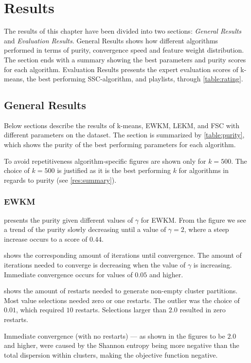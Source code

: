 \documentclass[../report.tex]{subfiles}
\begin{document}
\chapter{Results}
The results of this chapter have been divided into two sections: \textit{General Results} and \textit{Evaluation Results}. General Results shows how different algorithms performed in terms of purity, convergence speed and feature weight distribution. The section ends with a summary showing the best parameters and purity scores for each algorithm. Evaluation Results presents the expert evaluation scores of k-means, the best performing SSC-algorithm, and playlists, through \cref{table:rating}.

\section{General Results}
\label{section:general}
Below sections describe the results of k-means, EWKM, LEKM, and FSC with different parameters on the dataset. The section is summarized by \cref{table:purity}, which shows the purity of the best performing parameters for each algorithm.

To avoid repetitiveness algorithm-specific figures are shown only for $k=500$. The choice of $k=500$ is justified as it is the best performing $k$ for algorithms in regards to purity (see \cref{res:summary}).

\subsection{EWKM}
\label{subsection:ewkm}

 presents the purity given different values of $\gamma$ for EWKM. From the figure we see a trend of the purity slowly decreasing until a value of $\gamma = 2$, where a steep increase occurs to a score of $0.44$.

 shows the corresponding amount of iterations until convergence. The amount of iterations needed to converge is decreasing when the value of $\gamma$ is increasing. Immediate convergence occurs for values of $0.05$ and higher.

 shows the amount of restarts needed to generate non-empty cluster partitions. Most value selections needed zero or one restarts. The outlier was the choice of $0.01$, which required $10$ restarts. Selections larger than $2.0$ resulted in zero restarts.

Immediate convergence (with no restarts) --- as shown in the figures to be $2.0$ and higher, were caused by the Shannon entropy being more negative than the total dispersion within clusters, making the objective function negative.
\end{document}

